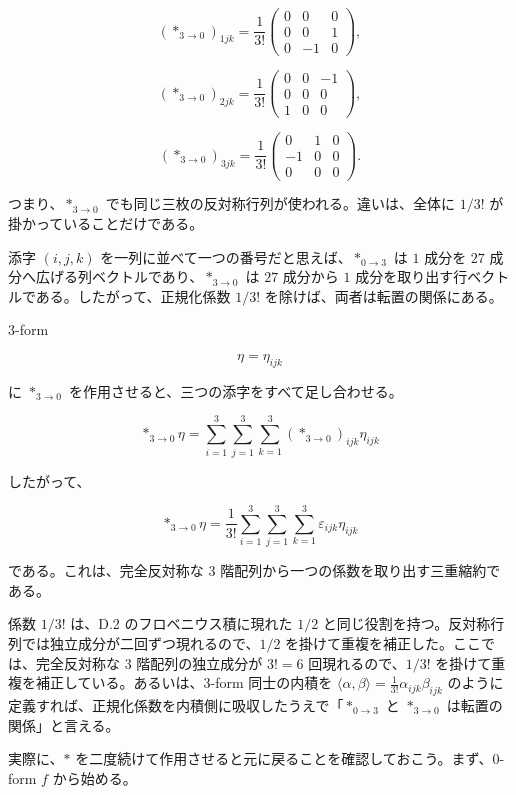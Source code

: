 \documentclass[a4paper,12pt,openany]{book}
\begin{document}
\[
(\ast_{3\to0})_{1jk}
=
\frac{1}{3!}
\begin{pmatrix}
0&0&0\\
0&0&1\\
0&-1&0
\end{pmatrix},
\]

\[
(\ast_{3\to0})_{2jk}
=
\frac{1}{3!}
\begin{pmatrix}
0&0&-1\\
0&0&0\\
1&0&0
\end{pmatrix},
\]

\[
(\ast_{3\to0})_{3jk}
=
\frac{1}{3!}
\begin{pmatrix}
0&1&0\\
-1&0&0\\
0&0&0
\end{pmatrix}.
\]

つまり、\(\ast_{3\to0}\)
でも同じ三枚の反対称行列が使われる。違いは、全体に \(1/3!\)
が掛かっていることだけである。

添字 \((i,j,k)\) を一列に並べて一つの番号だと思えば、\(\ast_{0\to3}\) は
\(1\) 成分を \(27\) 成分へ広げる列ベクトルであり、\(\ast_{3\to0}\) は
\(27\) 成分から \(1\)
成分を取り出す行ベクトルである。したがって、正規化係数 \(1/3!\)
を除けば、両者は転置の関係にある。

\(3\)-form

\[
\eta
=
\eta_{ijk}
\]

に \(\ast_{3\to0}\) を作用させると、三つの添字をすべて足し合わせる。

\[
\ast_{3\to0}\eta
=
\sum_{i=1}^{3}
\sum_{j=1}^{3}
\sum_{k=1}^{3}
(\ast_{3\to0})_{ijk}\eta_{ijk}
\]

したがって、

\[
\ast_{3\to0}\eta
=
\frac{1}{3!}
\sum_{i=1}^{3}
\sum_{j=1}^{3}
\sum_{k=1}^{3}
\varepsilon_{ijk}\eta_{ijk}
\]

である。これは、完全反対称な \(3\)
階配列から一つの係数を取り出す三重縮約である。

係数 \(1/3!\) は、D.2 のフロベニウス積に現れた \(1/2\)
と同じ役割を持つ。反対称行列では独立成分が二回ずつ現れるので、\(1/2\)
を掛けて重複を補正した。ここでは、完全反対称な \(3\) 階配列の独立成分が
\(3!=6\) 回現れるので、\(1/3!\)
を掛けて重複を補正している。あるいは、\(3\)-form 同士の内積を
\(\langle\alpha,\beta\rangle = \frac{1}{3!}\alpha_{ijk}\beta_{ijk}\)
のように定義すれば、正規化係数を内積側に吸収したうえで「\(\ast_{0\to3}\)
と \(\ast_{3\to0}\) は転置の関係」と言える。

実際に、\(\ast\)
を二度続けて作用させると元に戻ることを確認しておこう。まず、\(0\)-form
\(f\) から始める。
\end{document}
